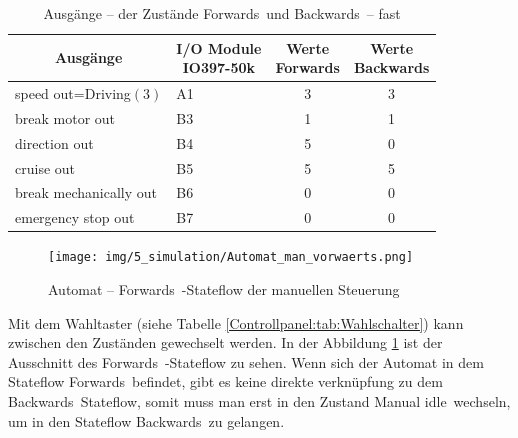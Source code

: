 \pagebreak[1]
\begin{table}[!ht]
	\centering
	\caption{Ausgänge – der Zustände \frqq Forwards\flqq\ und \frqq Backwards\flqq\ –  \frqq fast\flqq}
	\label{Automat_man:tab:z_V_schnell}
	\begin{tabular}{cccc}
		\hline
		\textbf{Ausgänge}                           & \makecell{\textbf{I/O Module}         \\ \textbf{IO397-50k}}    & \makecell{\textbf{Werte}     \\ \textbf{\frqq Forwards\flqq}} & \makecell{\textbf{Werte}     \\ \textbf{\frqq Backwards\flqq}} \\ \hline
		\multicolumn{1}{l|}{speed out=Driving$(3)$} & \multicolumn{1}{l|}{A1}       & 3 & 3 \\
		\multicolumn{1}{l|}{break motor out}        & \multicolumn{1}{l|}{B3}       & 1 & 1 \\
		\multicolumn{1}{l|}{direction out}          & \multicolumn{1}{l|}{B4}       & 5 & 0 \\
		\multicolumn{1}{l|}{cruise out}             & \multicolumn{1}{l|}{B5}       & 5 & 5 \\
		\multicolumn{1}{l|}{break mechanically out} & \multicolumn{1}{l|}{ B6}      & 0 & 0 \\
		\multicolumn{1}{l|}{emergency stop out}     & \multicolumn{1}{l|}{B7}       & 0 & 0 \\ \hline
	\end{tabular}
\end{table}
\pagebreak[1]

\pagebreak[1]
\begin{figure}[!ht]
	\begin{center}
		\texttt{[image: img/5\_simulation/Automat\_man\_vorwaerts.png]}
		\caption{Automat – \frqq Forwards\flqq\ -Stateflow der manuellen Steuerung}
		\label{Automat_man:img:man_vorwärts}
	\end{center}
\end{figure}
\pagebreak[1]



Mit dem Wahltaster (siehe Tabelle \ref{Controllpanel:tab:Wahlschalter}) kann zwischen den Zuständen gewechselt werden. In der Abbildung \ref{Automat_man:img:man_vorwärts} ist der Ausschnitt des \frqq Forwards\flqq\ -Stateflow zu sehen. Wenn sich der Automat in dem Stateflow \frqq Forwards\flqq\ befindet, gibt es keine direkte verknüpfung zu dem \frqq Backwards\flqq\ Stateflow, somit muss man erst in den Zustand \frqq Manual idle\flqq\ wechseln, um in den Stateflow \frqq Backwards\flqq\ zu gelangen.

